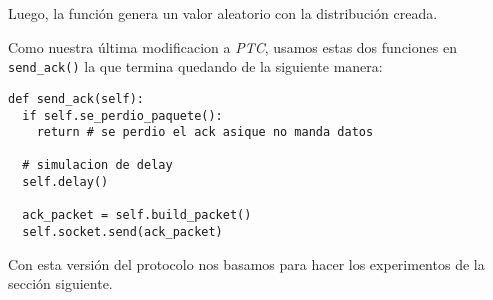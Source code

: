 Luego, la funci\'on  genera un valor aleatorio con la distribuci\'on creada.  

Como nuestra \'ultima modificacion a \emph{PTC}, usamos estas dos funciones en \texttt{send\_ack()} la que termina quedando de la siguiente manera:

\begin{verbatim}
def send_ack(self):
  if self.se_perdio_paquete():
    return # se perdio el ack asique no manda datos

  # simulacion de delay
  self.delay()

  ack_packet = self.build_packet()
  self.socket.send(ack_packet)
\end{verbatim}

Con esta versi\'on del protocolo nos basamos para hacer los experimentos de la secci\'on siguiente. 

